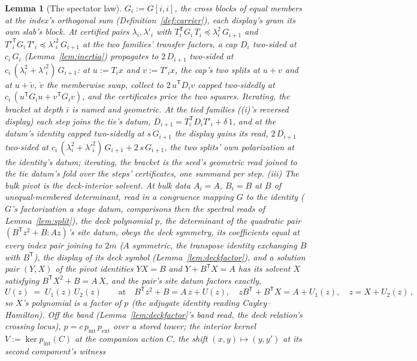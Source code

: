 \documentclass[11pt]{article}
\newtheorem{lemma}{Lemma}
\theoremstyle{definition}
\begin{document}
\begin{lemma}[The spectator law]
$G_i:=G[i,i]$, the cross blocks of equal members at the index's
orthogonal sum (Definition~\ref{def:carrier}), each display's gram
its own slab's block. At certified pairs
$\lambda_i,\lambda'_i$ with
$T_i^{\mathsf T}G_i\,T_i\preceq\lambda_i^2\,G_{i+1}$ and
$T'^{\mathsf T}_iG_i\,T'_i\preceq\lambda'^2_i\,G_{i+1}$ at the two
families'
transfer factors, a cap
$D_i$ two-sided at $c_i\,G_i$ (Lemma~\ref{lem:inertia}) propagates to
$2\,D_{i+1}$ two-sided at $c_i\,(\lambda_i^2+\lambda'^2_i)\,G_{i+1}$: at
$u:=T_ix$ and $v:=T'_ix$, the cap's two splits at $u+v$ and at
$u+\check v$, $\check v$ the memberwise swap, collect to
$2\,u^{\mathsf T}D_iv$ capped two-sidedly at
$c_i\,(u^{\mathsf T}G_iu+v^{\mathsf T}G_iv)$, and
the certificates price the two squares. Iterating, the bracket at depth
$i$ is named and geometric. At the tied families ((i)'s reversed
display) each step joins the tie's datum,
$D_{i+1}=T_i^{\mathsf T}D_iT'_i+\delta\,1$, and at the datum's
identity capped two-sidedly at $s\,G_{i+1}$ the display gains its read,
$2\,D_{i+1}$ two-sided at
$c_i\,(\lambda_i^2+\lambda'^2_i)\,G_{i+1}+2\,s\,G_{i+1}$, the two
splits' own
polarization at the identity's datum; iterating, the bracket is the
seed's geometric read joined to the tie datum's fold over the steps'
certificates, one summand per step.
\emph{(iii) The bulk pivot is the deck-interior solvent.} At bulk data
$A_i=A$, $B_i=B$ at $B$ of unequal-membered determinant, read in a
congruence mapping
$G$ to the identity ($G$'s factorization a stage datum,
comparisons then the spectral reads of Lemma~\ref{lem:split}), the
\emph{deck polynomial} $p$, the determinant of the quadratic pair
$(B^{\mathsf T}z^2+B\!:\!Az)$'s site datum, obeys
the deck symmetry, its coefficients equal at every index pair joining
to $2m$ ($A$ symmetric, the transpose identity exchanging $B$ with
$B^{\mathsf T}$), the display of its deck symbol
(Lemma~\ref{lem:deckfactor}), and a solution pair $(Y,X)$ of the
pivot identities $YX=B$ and $Y+B^{\mathsf T}X=A$ has its
\emph{solvent} $X$ satisfying
$B^{\mathsf T}X^2+B=A\,X$, and the
pair's site datum factors exactly,
\[
U(z)\;=\;U_1(z)\,U_2(z)
\qquad\text{at}\quad
B^{\mathsf T}z^2+B=A\,z+U(z),\quad
zB^{\mathsf T}+B^{\mathsf T}X=A+U_1(z),\quad z=X+U_2(z)\,,
\]
so $X$'s polynomial is a factor of $p$ (the adjugate identity reading
Cayley--Hamilton). Off the band (Lemma~\ref{lem:deckfactor}'s band
read, the deck relation's crossing locus), $p=c\,p_{\mathrm{int}}\,
p_{\mathrm{ext}}$ over a stored tower; the \emph{interior kernel}
$V:=\ker p_{\mathrm{int}}(C)$ at the companion action $C$, the shift
$(x,y)\mapsto(y,y')$ at its second component's witness

\end{lemma}
\end{document}
